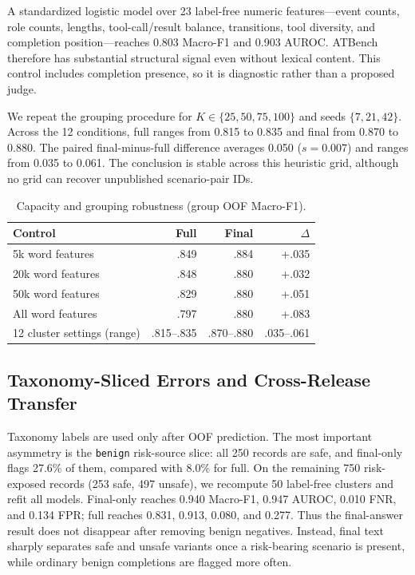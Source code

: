 \documentclass[10pt,twocolumn,twoside]{article}
\begin{document}
A standardized logistic model over 23 label-free numeric features---event counts,
role counts, lengths, tool-call/result balance, transitions, tool diversity, and
completion position---reaches 0.803 Macro-F1 and 0.903 AUROC. ATBench therefore has
substantial structural signal even without lexical content. This control includes
completion presence, so it is diagnostic rather than a proposed judge.

We repeat the grouping procedure for $K\in\{25,50,75,100\}$ and seeds
$\{7,21,42\}$. Across the 12 conditions, full ranges from 0.815 to 0.835 and final
from 0.870 to 0.880. The paired final-minus-full difference averages 0.050
($s=0.007$) and ranges from 0.035 to 0.061. The conclusion is stable across this
heuristic grid, although no grid can recover unpublished scenario-pair IDs.

\begin{table}[t]
\centering
\caption{Capacity and grouping robustness (group OOF Macro-F1).}
\label{tab:robustness}
\scriptsize
\begin{tabular}{lrrr}
\toprule
Control & Full & Final & $\Delta$ \\
\midrule
5k word features & .849 & .884 & +.035 \\
20k word features & .848 & .880 & +.032 \\
50k word features & .829 & .880 & +.051 \\
All word features & .797 & .880 & +.083 \\
\midrule
12 cluster settings (range) & .815--.835 & .870--.880 & .035--.061 \\
\bottomrule
\end{tabular}
\end{table}

\subsection{Taxonomy-Sliced Errors and Cross-Release Transfer}
Taxonomy labels are used only after OOF prediction. The most important asymmetry is
the \texttt{benign} risk-source slice: all 250 records are safe, and final-only flags
27.6\% of them, compared with 8.0\% for full. On the remaining 750 risk-exposed
records (253 safe, 497 unsafe), we recompute 50 label-free clusters and refit all
models. Final-only reaches 0.940 Macro-F1, 0.947 AUROC, 0.010 FNR, and 0.134 FPR;
full reaches 0.831, 0.913, 0.080, and 0.277. Thus the final-answer result does not
disappear after removing benign negatives. Instead, final text sharply separates safe and
unsafe variants once a risk-bearing scenario is present, while ordinary benign
completions are flagged more often.
\end{document}
